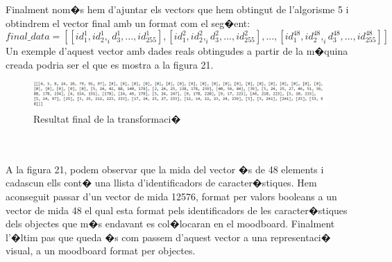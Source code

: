 \documentclass[12pt,a4paper,openright,oneside]{article}
\numberwithin{equation}{section}
\theoremstyle{definition}
\begin{document}
Finalment nom�s hem d'ajuntar els vectors que hem obtingut de l'algorisme 5 i obtindrem el vector final amb un format com el seg�ent:
\[final\_data = [[id_1^1,id_2^1,_id_3^1, ...,id_{255}^1], [id_1^2,id_2^2,_id_3^2, ...,id_{255}^2], ..., [id_1^{48},id_2^{48},_id_3^{48}, ...,id_{255}^{48}]]\]
Un exemple d'aquest vector amb dades reals obtingudes a partir de la m�quina creada podria ser el que es mostra a la figura 21.
\begin{figure}[h!]
\begin{center}
\includegraphics[width=\textwidth]{finaldata}
\caption{Resultat final de la transformaci�}
\end{center}
\end{figure}
\\\\
A la figura 21, podem observar que la mida del vector �s de 48 elements i cadascun ells cont� una llista d'identificadors de caracter�stiques. Hem aconseguit passar d'un vector de mida 12576, format per valors booleans a un vector de mida 48 el qual esta format pels identificadors de les caracter�stiques dels objectes que m�s endavant es col�locaran en el moodboard. Finalment l'�ltim pas que queda �s com passem d'aquest vector a una representaci� visual, a un moodboard format per objectes.
\end{document}

